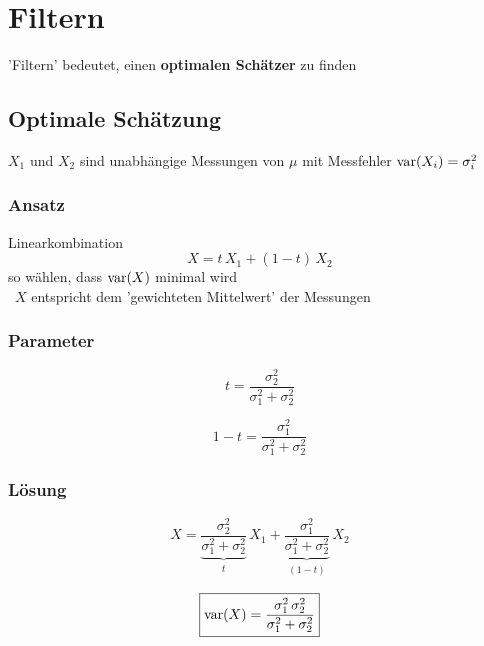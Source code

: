 \section{Filtern}

'Filtern' bedeutet, einen \textbf{optimalen Schätzer} zu finden


\subsection{Optimale Schätzung}

$X_1$ und $X_2$ sind  unabhängige Messungen von $\mu$ mit Messfehler $\mathrm{var}(X_i) = \sigma_i^2 $ 


\subsubsection{Ansatz}

Linearkombination 
$$ \boxed{ X = t \, X_1 + (1-t) \, X_2} $$
so wählen, dass $\mathrm{var}(X)$ minimal wird \\
\textrightarrow\ $X$ entspricht dem 'gewichteten Mittelwert' der Messungen


\subsubsection{Parameter}

\begin{minipage}{0.48\columnwidth}
    $$ \boxed{ t = \frac{\sigma_2^2}{\sigma_1^2 + \sigma_2^2} }$$
\end{minipage}
\hfill
\begin{minipage}{0.48\columnwidth}
    $$ \boxed{ 1-t  = \frac{\sigma_1^2}{\sigma_1^2 + \sigma_2^2} }$$
\end{minipage}


\subsubsection{Lösung}

\begin{minipage}{0.6\columnwidth}
    $$ \boxed{ X = \underbrace{ \frac{\sigma_2^2}{\sigma_1^2 + \sigma_2^2} }_{\substack{t}}  \, X_1 +  
    \underbrace{ \frac{\sigma_1^2}{\sigma_1^2 + \sigma_2^2} }_{\substack{(1-t)}} \, X_2 } $$
\end{minipage}
\hfill
\begin{minipage}{0.38\columnwidth}
    $$ \boxed{ \mathrm{var}(X) = \frac{\sigma_1^2 \, \sigma_2^2}{\sigma_1^2 + \sigma_2^2} } $$
\end{minipage}

